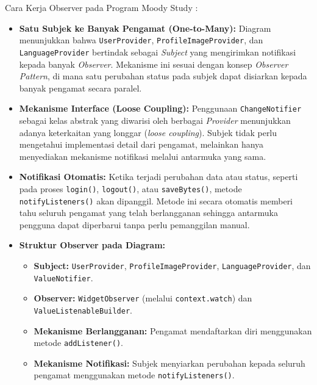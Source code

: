 \documentclass[11pt]{article}
\begin{document}
Cara Kerja Observer pada Program Moody Study :
\begin{itemize}

\item \textbf{Satu Subjek ke Banyak Pengamat (One-to-Many):} Diagram menunjukkan bahwa \texttt{UserProvider}, \texttt{ProfileImageProvider}, dan \texttt{LanguageProvider} bertindak sebagai \textit{Subject} yang mengirimkan notifikasi kepada banyak \textit{Observer}. Mekanisme ini sesuai dengan konsep \textit{Observer Pattern}, di mana satu perubahan status pada subjek dapat disiarkan kepada banyak pengamat secara paralel.

\item \textbf{Mekanisme Interface (Loose Coupling):} Penggunaan \texttt{ChangeNotifier} sebagai kelas abstrak yang diwarisi oleh berbagai \textit{Provider} menunjukkan adanya keterkaitan yang longgar (\textit{loose coupling}). Subjek tidak perlu mengetahui implementasi detail dari pengamat, melainkan hanya menyediakan mekanisme notifikasi melalui antarmuka yang sama.

\item \textbf{Notifikasi Otomatis:} Ketika terjadi perubahan data atau status, seperti pada proses \texttt{login()}, \texttt{logout()}, atau \texttt{saveBytes()}, metode \texttt{notifyListeners()} akan dipanggil. Metode ini secara otomatis memberi tahu seluruh pengamat yang telah berlangganan sehingga antarmuka pengguna dapat diperbarui tanpa perlu pemanggilan manual.

\item \textbf{Struktur Observer pada Diagram:}
\begin{itemize}
\item \textbf{Subject:} \texttt{UserProvider}, \texttt{ProfileImageProvider}, \texttt{LanguageProvider}, dan \texttt{ValueNotifier}.
\item \textbf{Observer:} \texttt{WidgetObserver} (melalui \texttt{context.watch}) dan \texttt{ValueListenableBuilder}.
\item \textbf{Mekanisme Berlangganan:} Pengamat mendaftarkan diri menggunakan metode \texttt{addListener()}.
\item \textbf{Mekanisme Notifikasi:} Subjek menyiarkan perubahan kepada seluruh pengamat menggunakan metode \texttt{notifyListeners()}.
\end{itemize}
\end{itemize}
\end{document}
